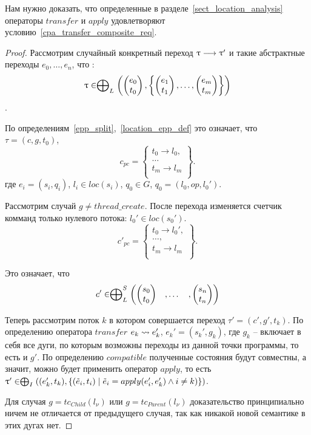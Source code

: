 Нам нужно доказать, что определенные в разделе~\ref{sect_location_analysis} операторы $transfer$ и $apply$ удовлетворяют условию~\ref{cpa_transfer_composite_req}.

\begin{proof}
Рассмотрим случайный конкретный переход $\uptau \longrightarrow \uptau'$ и такие абстрактные переходы $e_0, \dots, e_n$, что :
$$\uptau \in \mathrel{\bigoplus}_{L}
\left(
\begin{pmatrix}
e_0 \\
t_0 
\end{pmatrix},
\left\{
\begin{pmatrix}
e_1 \\
t_1 
\end{pmatrix},
\dots ,
\begin{pmatrix}
e_m \\
t_m 
\end{pmatrix}
\right\}
\right)$$.

По определениям~\ref{epp_split},~\ref{location_epp_def} это означает, что $\tau = (c, g, t_0)$,  
$$ c_{pc} = 
\left\lbrace
\begin{array}{c}
t_0 \to l_0,\\
\dots\\
t_m \to l_m\\
\end{array}
\right\rbrace.$$
где $e_i = (s_i, q_i)$, $l_i \in loc(s_i)$, $q_0 \in G$, $q_0 = (l_0, op, l_0')$.

Рассмотрим случай $g \neq thread\_create$. После перехода изменяется счетчик комманд только нулевого потока: $l_0' \in loc(s_0')$. $$ c'_{pc} = 
\left\lbrace
\begin{array}{c}
t_0 \to l_0',\\
\dots,\\
t_m \to l_m\\
\end{array}
\right\rbrace.$$

Это означает, что $$c' \in \mathrel{\bigoplus}^S_L 
\begin{pmatrix}
\begin{pmatrix}
s_0 \\
t_0 
\end{pmatrix}& ,
\dots& ,
\begin{pmatrix}
s_n \\
t_n 
\end{pmatrix}
\end{pmatrix}$$

Теперь рассмотрим поток $k$ в котором совершается переход $\tau' = (c', g', t_k)$. 
По определению оператора $transfer$ $e_k \leadsto e_k'$, $e_k' = (s_k', g_k)$, где $g_k$ -- включает в себя все дуги, по которым возможны переходы из данной точки программы, то есть и $g'$. 
По определению $compatible$ полученные состояния будут совместны, а значит, можно будет применить оператор $apply$, то есть
$\uptau' \in \mathrel{\bigoplus}_I((e_k', t_k), \{(\tilde{e}_i, t_i) \mid \tilde{e}_i = apply(e_i', e'_k) \land i \neq k)\})$.

Для случая $g = tc_{Child}(l_\nu)$ или $g = tc_{Parent}(l_\nu)$ доказательство принципиально ничем не отличается от предыдущего случая, так как никакой новой семантике в этих дугах нет. 
\end{proof}

